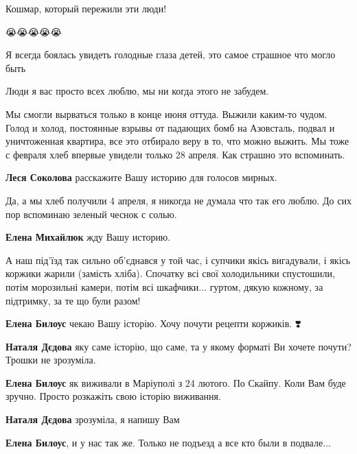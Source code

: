 
Кошмар, который пережили эти люди!

😭😭😭😭😭


Я всегда боялась увидеть голодные глаза детей, это самое страшное что могло быть


Люди я вас просто всех люблю, мы ни когда этого не забудем.


Мы смогли вырваться только в конце июня оттуда. Выжили каким-то чудом. Голод и
холод, постоянные взрывы от падающих бомб на Азовсталь, подвал и уничтоженная
квартира, все это отбирало веру в то, что можно выжить. Мы тоже с февраля хлеб
впервые увидели только 28 апреля. Как страшно это вспоминать.

\begin{itemize} %
\textbf{Леся Соколова} расскажите Вашу историю для голосов мирных. 💙
\end{itemize} %


Да, а мы хлеб получили 4 апреля, я никогда не думала что так его люблю. До сих
пор вспоминаю зеленый чеснок с солью.

\begin{itemize} %
\textbf{Елена Михайлюк} жду Вашу историю.
\end{itemize} %


А наш під'їзд так сильно об'єднався у той час, і супчики якісь вигадували, і
якісь коржики жарили (замість хліба). Спочатку всі свої холодильники
спустошили, потім морозильні камери, потім всі шкафчики... гуртом, дякую кожному, за
підтримку, за те що були разом!

\begin{itemize} %
\textbf{Елена Билоус} чекаю Вашу історію. Хочу почути рецепти коржиків. ❣️

\textbf{Наталя Дєдова} яку саме історію, що саме, та у якому форматі Ви хочете почути? Трошки не зрозуміла.

\textbf{Елена Билоус} як виживали в Маріуполі з 24 лютого. По Скайпу. Коли Вам буде зручно. Просто розкажіть свою історію виживання.

\textbf{Наталя Дєдова} зрозуміла, я напишу Вам

\textbf{Елена Билоус}, и у нас так же. Только не подъезд а все кто были в подвале...
\end{itemize} %

